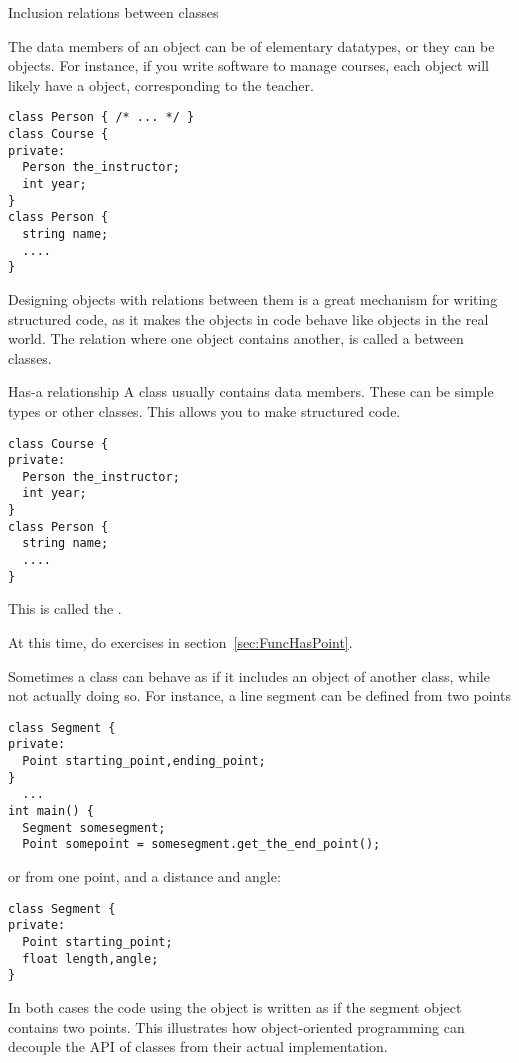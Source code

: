 
 {Inclusion relations between classes}
\label{sec:hasa}

The data members of an object can be of elementary datatypes, or they
can be objects. For instance, if you write software to manage courses,
each  object will likely have a  object,
corresponding to the teacher.
\begin{verbatim}
class Person { /* ... */ }
class Course {
private:
  Person the_instructor;
  int year;
}
class Person {
  string name;
  ....
}
\end{verbatim}

Designing objects with relations between them
is a great mechanism for writing structured code,
as it makes the objects in code behave like objects in the real world.
The relation where one object contains another, is called a
 between classes.

\begin{slide}{Has-a relationship}
  \label{sl:obj-hasa}
  A class usually contains data members. These can be simple types or
  other classes. This allows you to make structured code.
\begin{verbatim}
class Course {
private:
  Person the_instructor;
  int year;
}
class Person {
  string name;
  ....
}
\end{verbatim}
  This is
  called the .  
\end{slide}

At this time, do exercises in section~\ref{sec:FuncHasPoint}.

Sometimes a class can behave as if it includes an object of another
class, while not actually doing so. For instance, a line segment can
be defined from two points
\begin{verbatim}
class Segment {
private:
  Point starting_point,ending_point;
}
  ...
int main() {
  Segment somesegment;
  Point somepoint = somesegment.get_the_end_point();
\end{verbatim}
or from one point, and a distance and angle:
\begin{verbatim}
class Segment {
private:
  Point starting_point;
  float length,angle;
}
\end{verbatim}
In both cases the code using the object is written as if the segment
object contains two points.
This illustrates how object-oriented programming can decouple the
\ac{API} of classes from their actual implementation.


